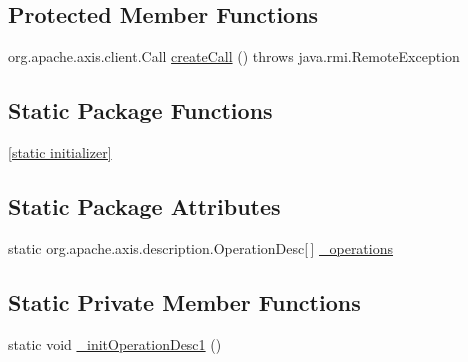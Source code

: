 \subsection*{Protected Member Functions}
\begin{DoxyCompactItemize}
\item 
org.apache.axis.client.Call \hyperlink{classorg_1_1glite_1_1security_1_1voms_1_1service_1_1compatibility_1_1VOMSCompatibilitySoapBindingStub_aa8552d77ffc238de779177d47789c216}{createCall} ()  throws java.rmi.RemoteException 
\end{DoxyCompactItemize}
\subsection*{Static Package Functions}
\begin{DoxyCompactItemize}
\item 
\hyperlink{classorg_1_1glite_1_1security_1_1voms_1_1service_1_1compatibility_1_1VOMSCompatibilitySoapBindingStub_aa7a09665307c8350c651a331e18377ec}{\mbox{[}static initializer\mbox{]}}
\end{DoxyCompactItemize}
\subsection*{Static Package Attributes}
\begin{DoxyCompactItemize}
\item 
static org.apache.axis.description.OperationDesc\mbox{[}$\,$\mbox{]} \hyperlink{classorg_1_1glite_1_1security_1_1voms_1_1service_1_1compatibility_1_1VOMSCompatibilitySoapBindingStub_a8d83a449a8e30b50cead97a91ea37fa7}{\_\-operations}
\end{DoxyCompactItemize}
\subsection*{Static Private Member Functions}
\begin{DoxyCompactItemize}
\item 
static void \hyperlink{classorg_1_1glite_1_1security_1_1voms_1_1service_1_1compatibility_1_1VOMSCompatibilitySoapBindingStub_af3c78f8a556ed2453d7f3c851b863478}{\_\-initOperationDesc1} ()
\end{DoxyCompactItemize}
